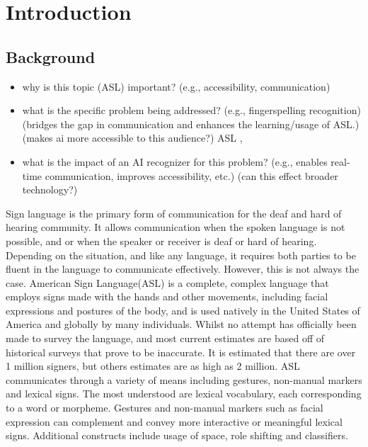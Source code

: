 \section{Introduction}
\subsection{Background}
\begin{itemize}
    \item why is this topic (ASL) important? (e.g., accessibility, communication)

    \item what is the specific problem being addressed? (e.g., fingerspelling recognition) (bridges the gap in communication and enhances the learning/usage of ASL.) (makes ai more accessible to this audience?)
          ASL ,
    \item what is the impact of an AI recognizer for this problem? (e.g., enables real-time communication, improves accessibility, etc.) (can this effect broader technology?)
\end{itemize}

Sign language is the primary form of communication for the deaf and hard of hearing community. It allows communication when the spoken language is not possible, and or when the speaker or receiver is deaf or hard of hearing.
Depending on the situation, and like any language, it requires both parties to be fluent in the language to communicate effectively. However, this is not always the case. American Sign Language(ASL) is a complete, complex language that employs signs made with the hands and other movements, including facial expressions and postures of the body, and is used natively in the
United States of America and globally by many individuals. Whilst no attempt has officially been made to survey the language, and most current estimates are based off of historical surveys that prove to be inaccurate\cite{mitchellHowManyPeople2006}. It is estimated that there are over 1 million signers\cite{AmericanSignLanguage}, but others estimates are as high as 2 million\cite{mitchellHowManyPeople2006}.
ASL communicates through a variety of means including gestures, non-manual markers and lexical signs. The most understood are lexical vocabulary, each corresponding to a word or morpheme. Gestures and non-manual markers such as facial expression can complement and convey more interactive or meaningful lexical signs. Additional constructs include usage of space, role shifting and classifiers.

